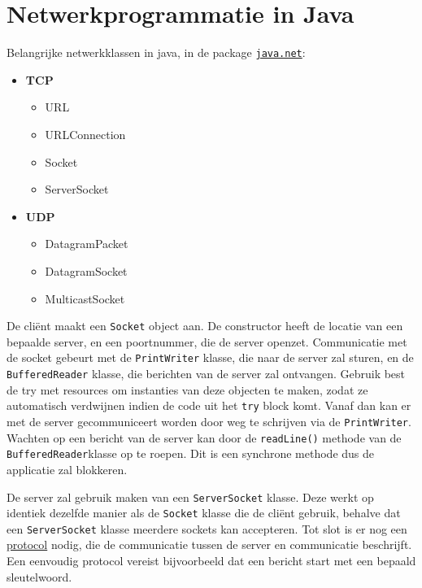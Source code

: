 \documentclass{report}
\begin{document}
\chapter{Netwerkprogrammatie in Java}
Belangrijke netwerkklassen in java, in de package \underline{\texttt{java.net}}:
\begin{itemize}
    \item \textbf{TCP} 
        \begin{itemize}
            \item URL
            \item URLConnection
            \item Socket
            \item ServerSocket
        \end{itemize}
    \item \textbf{UDP}
        \begin{itemize}
            \item DatagramPacket
            \item DatagramSocket
            \item MulticastSocket
        \end{itemize}
\end{itemize}

De cliënt maakt een \texttt{Socket} object aan. De constructor heeft de locatie van een bepaalde server, en een poortnummer, die de server openzet. Communicatie met de socket gebeurt met de \texttt{PrintWriter} klasse, die naar de server zal sturen, en de \texttt{BufferedReader} klasse, die berichten van de server zal ontvangen. Gebruik best de try met resources om instanties van deze objecten te maken, zodat ze automatisch verdwijnen indien de code uit het \texttt{try} block komt. Vanaf dan kan er met de server gecommuniceert worden door weg te schrijven via de \texttt{PrintWriter}. Wachten op een bericht van de server kan door de \texttt{readLine()} methode van de \texttt{BufferedReader}klasse op te roepen. Dit is een synchrone methode dus de applicatie zal blokkeren. 

De server zal gebruik maken van een \texttt{ServerSocket} klasse. Deze werkt op identiek dezelfde manier als de \texttt{Socket} klasse die de cliënt gebruik, behalve dat een \texttt{ServerSocket} klasse meerdere sockets kan accepteren. Tot slot is er nog een \underline{protocol} nodig, die de communicatie tussen de server en communicatie beschrijft. Een eenvoudig protocol vereist bijvoorbeeld dat een bericht start met een bepaald sleutelwoord.
\end{document}
